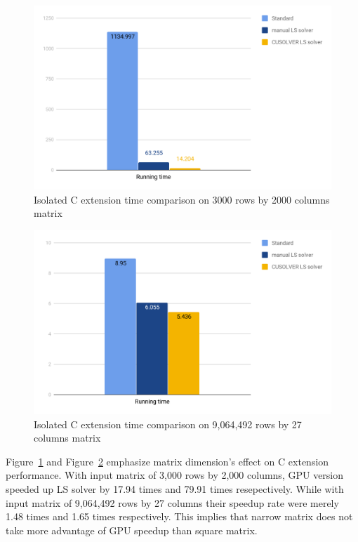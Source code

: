 \documentclass[English]{dicomopapers}
\begin{document}
\begin{figure}[ht]
  \vspace*{-2.2cm}
  \centering
  \includegraphics[width=\columnwidth,natwidth=1200,natheight=742]{c_square.png}
  \caption{Isolated C extension time comparison on 3000 rows by 2000 columns matrix}\label{fig:c_square}
\end{figure}

\begin{figure}[ht]
  \vspace*{-1.5cm}
  \centering
  \includegraphics[width=\columnwidth,natwidth=1200,natheight=742]{c_narrow.png}
  \caption{Isolated C extension time comparison on 9,064,492 rows by 27 columns matrix}\label{fig:c_narrow}
\end{figure}
Figure~\ref{fig:c_square} and Figure~\ref{fig:c_narrow} emphasize matrix dimension's effect on C extension performance. With input matrix of 3,000 rows by 2,000 columns, GPU version speeded up LS solver by 17.94 times and 79.91 times resepectively. While with input matrix of 9,064,492 rows by 27 columns their speedup rate were merely 1.48 times and 1.65 times respectively. This implies that narrow matrix does not take more advantage of GPU speedup than square matrix.
\end{document}
